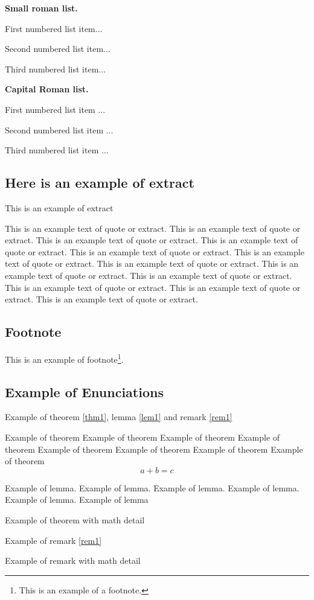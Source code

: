 \documentclass{isabec} %
\begin{document}
%
\textbf{Small roman list.}
\begin{romanlist}%
  \item First numbered list item...
  \item Second numbered list item...
  \item Third numbered list item...
\end{romanlist}
%
\textbf{Capital Roman list.}
\begin{Romanlist}%
  \item First numbered list item ...
  \item Second numbered list item ...
  \item Third numbered list item ...
\end{Romanlist}
%

\subsection{Here is an example of extract}
This is an example of extract

\begin{extract}
This is an example text of quote or extract. This is an example text of quote or extract. 
This is an example text of quote or extract. This is an example text of quote or extract.
This is an example text of quote or extract. This is an example text of quote or extract. 
This is an example text of quote or extract. This is an example text of quote or extract.
This is an example text of quote or extract. This is an example text of quote or extract. 
This is an example text of quote or extract. This is an example text of quote or extract.
\end{extract}

\subsection{Footnote}
This is an example of footnote\footnote{This is an example of a footnote.}.

\subsection{Example of Enunciations}  
Example of theorem \ref{thm1}, lemma \ref{lem1} and remark \ref{rem1}
\begin{theorem}\label{thm1}
Example of theorem Example of theorem Example of theorem Example of theorem
Example of theorem Example of theorem Example of theorem Example of theorem
\[ a+b= c \]
\end{theorem}
\begin{lemma}\label{lem1}
Example of lemma. Example of lemma. Example of lemma. Example of lemma. Example of lemma. Example of lemma
\end{lemma}
\begin{theorem}\label{thm2}
Example of theorem with math detail
\end{theorem}
Example of remark \ref{rem1}
\begin{remark}\label{rem1}
Example of remark with math detail
\end{remark}
\end{document}
